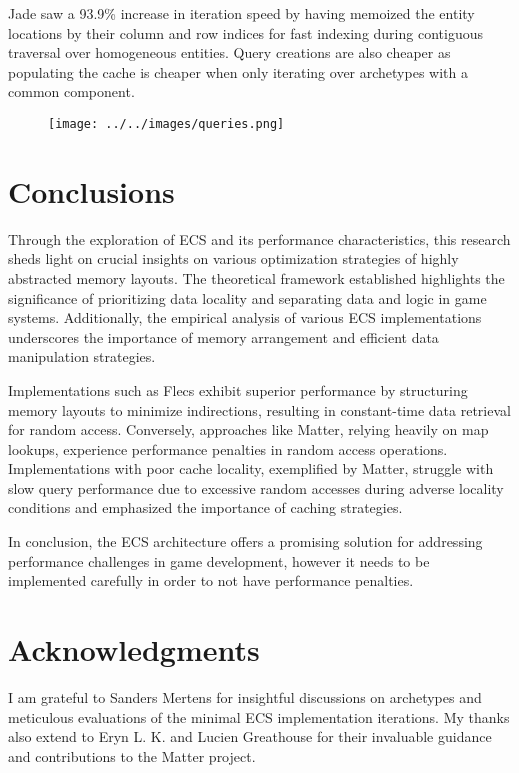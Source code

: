 \documentclass[openany, amssymb, psamsfonts]{amsart}
\theoremstyle{definition}
\numberwithin{equation}{section}
\begin{document}
Jade saw a 93.9\% increase in iteration speed by having memoized the entity locations by their column 
and row indices for fast indexing during contiguous traversal over homogeneous entities. Query creations
are also cheaper as populating the cache is cheaper when only iterating over archetypes with a common component.

\begin{figure}[htbp]
\centering
\texttt{[image: ../../images/queries.png]}\label{Fig 6: Queries}
\end{figure}

\section{Conclusions}
Through the exploration of ECS and its performance characteristics, this research sheds light 
on crucial insights on various optimization strategies of highly abstracted memory layouts. 
The theoretical framework established highlights the significance of prioritizing data locality 
and separating data and logic in game systems. Additionally, the empirical analysis of various 
ECS implementations underscores the importance of memory arrangement and efficient data 
manipulation strategies.

Implementations such as Flecs exhibit superior performance by 
structuring memory layouts to minimize indirections, resulting in constant-time data 
retrieval for random access. Conversely, approaches like Matter, relying heavily on map lookups, 
experience performance penalties in random access operations. Implementations with poor cache 
locality, exemplified by Matter, struggle with slow query performance due to excessive random 
accesses during adverse locality conditions and emphasized the importance of caching strategies.

In conclusion, the ECS architecture offers a promising solution for addressing performance 
challenges in game development, however it needs to be implemented carefully in order to not
have performance penalties.

\section{Acknowledgments}  
I am grateful to Sanders Mertens for insightful discussions on archetypes and 
meticulous evaluations of the minimal ECS implementation iterations. 
My thanks also extend to Eryn L. K. and Lucien Greathouse for their invaluable 
guidance and contributions to the Matter project.
\end{document}
